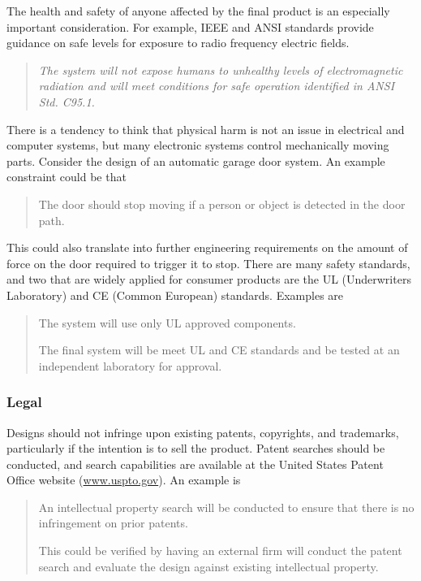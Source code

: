 The health and safety of anyone affected by the final product is an
especially important consideration. For example, IEEE and ANSI standards
provide guidance on safe levels for exposure to radio frequency electric
fields.

\begin{quote}
\emph{The system will not expose humans to unhealthy levels of
electromagnetic radiation and will meet conditions for safe operation
identified in ANSI Std. C95.1.}
\end{quote}

There is a tendency to think that physical harm is not an issue in
electrical and computer systems, but many electronic systems control
mechanically moving parts. Consider the design of an automatic garage
door system. An example constraint could be that

\begin{quote}
The door should stop moving if a person or object is detected in the
door path.
\end{quote}

This could also translate into further engineering requirements on the
amount of force on the door required to trigger it to stop. There are
many safety standards, and two that are widely applied for consumer
products are the UL (Underwriters Laboratory) and CE (Common European)
standards. Examples are

\begin{quote}
The system will use only UL approved components.

The final system will be meet UL and CE standards and be tested at an
independent laboratory for approval.
\end{quote}

\subsubsection*{Legal}\label{legal}

Designs should not infringe upon existing patents, copyrights, and
trademarks, particularly if the intention is to sell the product. Patent
searches should be conducted, and search capabilities are available at
the United States Patent Office website
(\href{http://www.uspto.gov}{www.uspto.gov}). An example is

\begin{quote}
An intellectual property search will be conducted to ensure that there
is no infringement on prior patents.

This could be verified by having an external firm will conduct the
patent search and evaluate the design against existing intellectual
property.
\end{quote}

